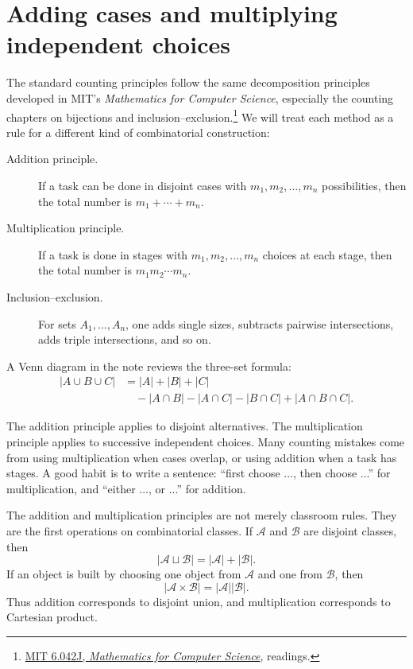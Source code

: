 
\section{Adding cases and multiplying independent choices}

The standard counting principles follow the same decomposition principles developed in MIT's \emph{Mathematics for Computer Science}, especially the counting chapters on bijections and inclusion--exclusion.\footnote{\href{https://ocw.mit.edu/courses/6-042j-mathematics-for-computer-science-spring-2015/pages/readings/}{MIT 6.042J, \emph{Mathematics for Computer Science}}, readings.} We will treat each method as a rule for a different kind of combinatorial construction:
\begin{description}
  \item[Addition principle.] If a task can be done in disjoint cases with \(m_1,m_2,\ldots,m_n\) possibilities, then the total number is \(m_1+\cdots+m_n\).
  \item[Multiplication principle.] If a task is done in stages with \(m_1,m_2,\ldots,m_n\) choices at each stage, then the total number is \(m_1m_2\cdots m_n\).
  \item[Inclusion--exclusion.] For sets \(A_1,\ldots,A_n\), one adds single sizes, subtracts pairwise intersections, adds triple intersections, and so on.

\end{description}

A Venn diagram in the note reviews the three-set formula:
\[
\begin{aligned}
|A\cup B\cup C|&=|A|+|B|+|C|\\
&\quad-|A\cap B|-|A\cap C|-|B\cap C|+|A\cap B\cap C|.
\end{aligned}
\]

The addition principle applies to disjoint alternatives.  The multiplication principle applies to successive independent choices.  Many counting mistakes come from using multiplication when cases overlap, or using addition when a task has stages.  A good habit is to write a sentence: ``first choose ..., then choose ...'' for multiplication, and ``either ..., or ...'' for addition.

The addition and multiplication principles are not merely classroom rules.  They are the first operations on combinatorial classes.  If \(\mathcal A\) and \(\mathcal B\) are disjoint classes, then
\[
  |\mathcal A\sqcup\mathcal B|=|\mathcal A|+|\mathcal B|.
\]
If an object is built by choosing one object from \(\mathcal A\) and one from \(\mathcal B\), then
\[
  |\mathcal A\times\mathcal B|=|\mathcal A||\mathcal B|.
\]
Thus addition corresponds to disjoint union, and multiplication corresponds to Cartesian product.

